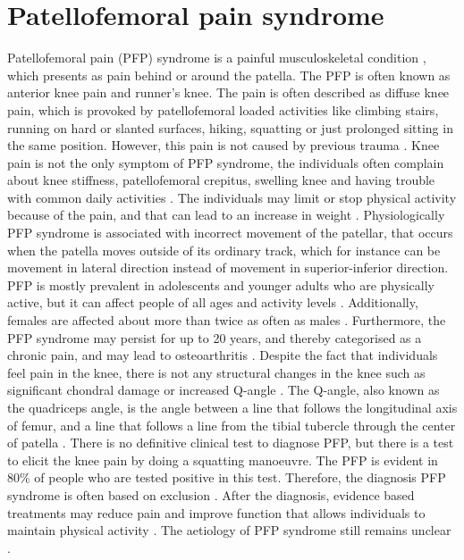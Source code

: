 \section{Patellofemoral pain syndrome}
Patellofemoral pain (PFP) syndrome is a painful musculoskeletal condition \citep{Maclachlan2017, Smith2015}, which presents as pain behind or around the patella. The PFP is often known as anterior knee pain and runner’s knee. The pain is often described as diffuse knee pain, which is provoked by patellofemoral loaded activities like climbing stairs, running on hard or slanted surfaces, hiking, squatting or just prolonged sitting in the same position.\citep{Smith2015, Crossley2016, Boudreau2017, Crossley2015} However, this pain is not caused by previous trauma \citep{Crossley2016}.
Knee pain is not the only symptom of PFP syndrome, the individuals often complain about knee stiffness, patellofemoral crepitus, swelling knee and having trouble with common daily activities \citep{Crossley2016, Martini2012}. The individuals may limit or stop physical activity because of the pain, and that can lead to an increase in weight \citep{Petersen2013, Crossley2016}.\newline
\noindent
Physiologically PFP syndrome is associated with incorrect movement of the patellar, that occurs when the patella moves outside of its ordinary track, which for instance can be movement in lateral direction instead of movement in superior-inferior direction.\citep{Martini2012} \newline
\noindent
PFP is mostly prevalent in adolescents and younger adults who are physically active, but it can affect people of all ages and activity levels \citep{Maclachlan2017, Crossley2016, Crossley2015}. Additionally,  females are affected about more than twice as often as males \citep{Petersen2013}. Furthermore, the PFP syndrome may persist for up to 20 years, and thereby categorised as a chronic pain, and may lead to osteoarthritis \citep{Petersen2013, Crossley2016}.\newline
\noindent
Despite the fact that individuals feel pain in the knee, there is not any structural changes in the knee such as significant chondral damage or increased Q-angle \citep{Petersen2013}. The Q-angle, also known as the quadriceps angle, is the angle between a line that follows the longitudinal axis of femur, and a line that follows a line from the tibial tubercle through the center of patella \citep{Dahab2011}. \newline
\noindent
There is no definitive clinical test to diagnose PFP, but there is a test to elicit the knee pain by doing a squatting manoeuvre. The PFP is evident in 80\% of people who are tested positive in this test.\citep{Crossley2016, Crossley2015} Therefore, the diagnosis PFP syndrome is often based on exclusion \citep{Petersen2013}. After the diagnosis, evidence based treatments may reduce pain and improve function that allows individuals to maintain physical activity \citep{Crossley2015}.
The aetiology of PFP syndrome still remains unclear \citep{Smith2015}.

